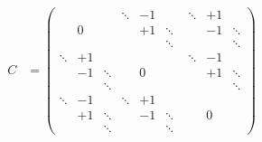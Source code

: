 


\begin{align}
C&=\left(
	\begin{array}{ccc|ccc|ccc}
	&&&\ddots &-1& &\ddots &+1&\\	
	&0&&&+1&\ddots&&-1&\ddots\\
	&&&&&\ddots&&&\ddots\\	
	\hline
	\ddots &+1&&&&&\ddots &-1&\\
	&-1 &\ddots&&0&\quad&&+1&\ddots\\
	&&\ddots&&&&&&\ddots\\
	\hline
	\ddots &-1&&\ddots &+1&&&&\\
	&+1 &\ddots&&-1&\ddots&&0&\\
	&&\ddots&&&\ddots&&&
	\end{array}\right)
\label{eq:C_matrix}
\end{align}